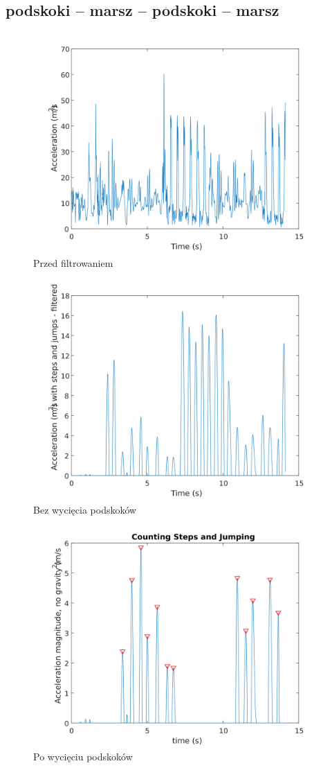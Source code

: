 \documentclass[a4paper, 12pt, titlepage]{article}
\begin{document}
        \subsection{podskoki -- marsz -- podskoki -- marsz}
            \begin{figure}[H]
                \centering
                \includegraphics[width=0.7\columnwidth]
                    {krok3a.png}
                \caption{Przed filtrowaniem}
            \end{figure}\noindent
            \begin{figure}[H]
                \centering
                \includegraphics[width=0.7\columnwidth]
                    {krok3.png}
                \caption{Bez wycięcia podskoków}
            \end{figure}\noindent
            \begin{figure}[H]
                \centering
                \includegraphics[width=0.7\columnwidth]
                    {krok3b.png}
                \caption{Po wycięciu podskoków}
            \end{figure}\noindent
\end{document}
